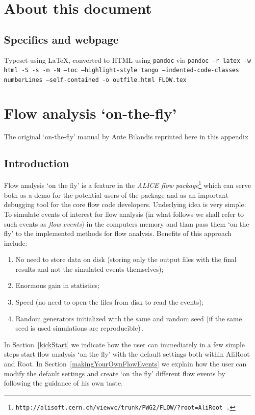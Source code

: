 \documentclass[a4paper]{book}
\numberwithin{equation}{subsection}
\begin{document}
\appendix		
	\chapter{About this document}
        \section{Specifics and webpage}
        Typeset using \LaTeX, converted to HTML using \texttt{pandoc} via \texttt{pandoc -r latex -w html -S -s -m -N --toc --highlight-style tango --indented-code-classes numberLines --self-contained -o outfile.html FLOW.tex}
        
        \chapter{Flow analysis `on-the-fly'}\label{sec:ante}
        	The original `on-the-fly' manual by Ante Biland\zic is reprinted here in this appendix

        \section{Introduction}
Flow analysis `on the fly' is a feature in the \textit{ALICE flow package}\footnote{\texttt{http://alisoft.cern.ch/viewvc/trunk/PWG2/FLOW/?root=AliRoot .}} which can serve both as a demo for the potential users of the package and as an important debugging tool for the core flow code developers. Underlying idea is very simple: To simulate events of interest for flow analysis (in what follows we shall refer to such events as \textit{flow events}) in the computers memory and than pass them `on the fly' to the implemented methods for flow analysis. Benefits of this approach include: 
%
\begin{enumerate}
\item No need to store data on disk (storing only the output files with the final results and not the simulated events themselves);
\item Enormous gain in statistics; 
\item Speed (no need to open the files from disk to read the events);
\item Random generators initialized with the same and random seed (if the same seed is used simulations are reproducible)\,. 
\end{enumerate}
%
In Section~\ref{kickStart} we indicate how the user can immediately in a few simple steps start flow analysis `on the fly' with the default settings both within AliRoot and Root. In Section~\ref{makingYourOwnFlowEvents} we explain how the user can modify the default settings and create `on the fly' different flow events by following the guidance of his own taste. 
 
\end{document}
